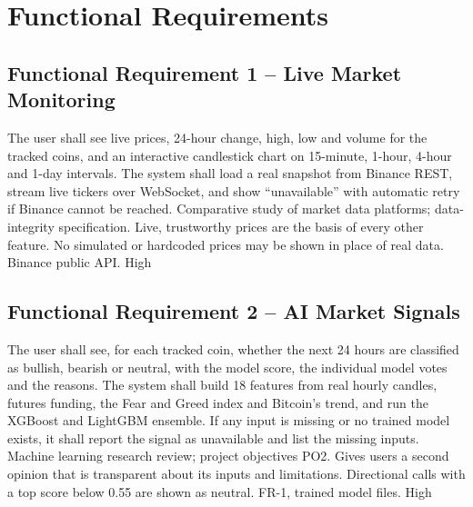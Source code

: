 \section{Functional Requirements}

\subsection{Functional Requirement 1 -- Live Market Monitoring}
{The user shall see live prices, 24-hour change, high, low and volume for the tracked coins, and an interactive candlestick chart on 15-minute, 1-hour, 4-hour and 1-day intervals.}
{The system shall load a real snapshot from Binance REST, stream live tickers over WebSocket, and show ``unavailable'' with automatic retry if Binance cannot be reached.}
{Comparative study of market data platforms; data-integrity specification.}
{Live, trustworthy prices are the basis of every other feature.}
{No simulated or hardcoded prices may be shown in place of real data.}
{Binance public API.}
{High}

\subsection{Functional Requirement 2 -- AI Market Signals}
{The user shall see, for each tracked coin, whether the next 24 hours are classified as bullish, bearish or neutral, with the model score, the individual model votes and the reasons.}
{The system shall build 18 features from real hourly candles, futures funding, the Fear and Greed index and Bitcoin's trend, and run the XGBoost and LightGBM ensemble. If any input is missing or no trained model exists, it shall report the signal as unavailable and list the missing inputs.}
{Machine learning research review; project objectives PO2.}
{Gives users a second opinion that is transparent about its inputs and limitations.}
{Directional calls with a top score below 0.55 are shown as neutral.}
{FR-1, trained model files.}
{High}

